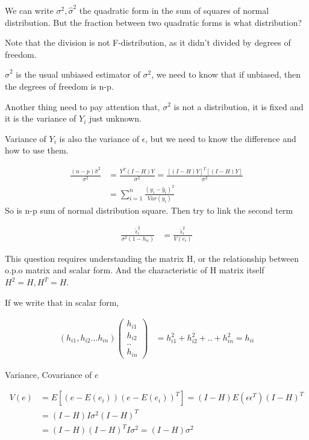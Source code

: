 We can write $\sigma^2, \hat{\sigma}^2$ the quadratic form in the sum of squares of normal distribution. But the fraction between two quadratic forms is what distribution? 

Note that the division is not F-distribution, as it didn't divided by degrees of freedom. 

$\hat{\sigma}^2$ is the usual unbiased estimator of $\sigma^2$, we need to know that if unbiased, then the degrees of freedom is n-p.

Another thing need to pay attention that,  $\sigma^2$ is not a distribution, it is fixed and it is the variance of $Y_i$ just unknown. 

Variance of $Y_i$ is also the variance of $\epsilon$, but we need to know the difference and how to use them.

\begin{align*}
	\frac{(n-p)\hat{\sigma}^2 }{\sigma^2} &= \frac{Y^T (I-H) Y}{\sigma^2} = \frac{[(I-H)Y]^T [(I-H)Y]}{\sigma^2} \\
	&= \sum_{i=1}^n  \frac{(y_i-\hat{y}_i)^2}{Var(y_i)}
\end{align*}
So  is n-p sum of normal distribution square. Then try to link the second term

\begin{align*}
	\frac{\hat{\epsilon}_i^2}{\sigma^2(1-h_{ii})}&= \frac{\hat{\epsilon}_i^2}{V(e_i)} 
\end{align*}

This question requires understanding the matrix H, or the relationship between o.p.o matrix and scalar form. And the characteristic of H matrix itself $H^2 = H, H^T = H$. 

If we write that in scalar form, 

\begin{align*}
	(h_{i1} , h_{i2} ... h_{in}) \begin{pmatrix*} 
		h_{i1} \\
		h_{i2}\\
		..\\
		h_{in}
		\end{pmatrix*}
		  &= h_{i1}^2 + h_{i2}^2 + .. + h_{in}^2 = h_{ii}
\end{align*} 

Variance, Covariance of $e$

\begin{align*}
	V(e) &= E[(e - E(e_i)) (e - E(e_i))^T] = (I-H) E(\epsilon \epsilon^T) (I-H)^T \\
	&= (I-H) I \sigma^2 (I-H)^T \\
	&= (I-H)  (I-H)^T  I \sigma^2 = (I-H) \sigma^2
\end{align*} 

